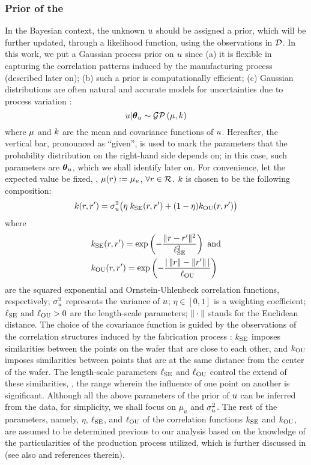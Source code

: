 \subsubsection{Prior of the \qoi}
In the Bayesian context, the unknown $u$ should be assigned a prior, which will be further updated, through a likelihood function, using the observations in $\mathcal{D}$. In this work, we put a Gaussian process prior \cite{rasmussen2006} on $u$ since (a) it is flexible in capturing the correlation patterns induced by the manufacturing process (described later on); (b) such a prior is computationally efficient; (c) Gaussian distributions are often natural and accurate models for uncertainties due to process variation \cite{srivastava2010, juan2011, juan2012}:
\[
  \u | \vparam_\u \sim \gaussianp{\fMean}{\fCov}
\]
where $\fMean$ and $\fCov$ are the mean and covariance functions of $u$. Hereafter, the vertical bar, pronounced as ``given'', is used to mark the parameters that the probability distribution on the right-hand side depends on; in this case, such parameters are ${\boldsymbol\theta}_u$, which we shall identify later on. For convenience, let the expected value be fixed, \ie, $\fMean{\r} := \mu_\u$, $\forall r \in \mathcal{R}$.
$\fCov$ is chosen to be the following composition:
\begin{equation} \elabel{covariance-function}
  \fCov{\r, \r'} = \sigma_\u^2 \big( \eta \; \fCov_\SE(\r, \r') + (1 - \eta) \fCov_\OU(\r, \r') \big)
\end{equation}
where
\begin{align*}
  & \fCov_\SE(\r, \r') = \exp\left(-\frac{\norm{\r - \r'}^2}{\ell_\SE^2}\right) \text{ and} \\
  & \fCov_\OU(\r, \r') = \exp\left(- \frac{\abs{\,\norm{\r} - \norm{\r'}\,}}{\ell_\OU} \right)
\end{align*}
are the squared exponential and Ornstein-Uhlenbeck correlation functions, respectively; $\sigma_u^2$ represents the variance of $u$; $\eta \in [0, 1]$ is a weighting coefficient; $\ell_{\text{SE}}$ and $\ell_{\text{OU}} > 0$ are the length-scale parameters; $\| \cdot \|$ stands for the Euclidean distance.
The choice of the covariance function is guided by the observations of the correlation structures induced by the fabrication process \cite{chandrakasan2001, cheng2011}: $\fCov_\SE$ imposes similarities between the points on the wafer that are close to each other, and $\fCov_\OU$ imposes similarities between points that are at the same distance from the center of the wafer.
The length-scale parameters $\ell_{\text{SE}}$ and $\ell_{\text{OU}}$ control the extend of these similarities, \ie, the range wherein the influence of one point on another is significant.
Although all the above parameters of the prior of $u$ can be inferred from the data, for simplicity, we shall focus on $\mu_u$ and $\sigma_u^2$.
The rest of the parameters, namely, $\eta$, $\ell_{\text{SE}}$, and $\ell_{\text{OU}}$ of the correlation functions $\fCov_\SE$ and $\fCov_\OU$, are assumed to be determined previous to our analysis based on the knowledge of the particularities of the production process utilized, which is further discussed in  (see also \cite{marzouk2009} and references therein).

